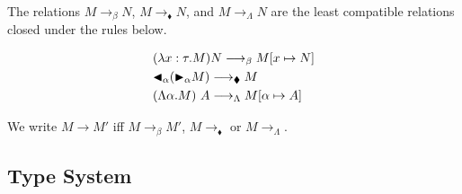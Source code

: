     The relations $M \longrightarrow_\beta N$, $M \longrightarrow_\blacklozenge N$, and $M \longrightarrow_\Lambda N$ are the least compatible relations closed under the rules below.
\begin{center}
  \begin{align*}
     & (\lambda x:\tau.M) N \longrightarrow_\beta M[x \mapsto N]         \\
     & {\mathop{\blacktriangleleft}}_\alpha ({\mathop{\blacktriangleright}}_\alpha M)\longrightarrow_\blacklozenge M         \\
     & (\Lambda \alpha.M)\ A \longrightarrow_\Lambda M[\alpha \mapsto A]
  \end{align*}
\end{center}

We write \( M \longrightarrow M' \) iff \( M \longrightarrow_{\beta} M' \), \(
M \longrightarrow_\blacklozenge \) or \( M \longrightarrow_\Lambda \).

\subsection{Type System}

  \begin{center}
    \infrule{
    }{
      \vdash \emptyset
    }
    \hfil
    \hfil
  \end{center}


  \begin{center}
    \infrule{
    }{
      \V \emptyset
    }
    \hfil
  \end{center}

  \begin{center}
     \hfil
  \end{center}


